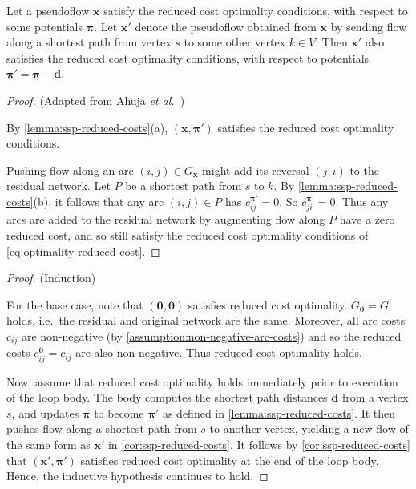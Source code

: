 \begin{cor} \label{cor:ssp-reduced-costs}
    Let a pseudoflow $\mathbf{x}$ satisfy the reduced cost optimality conditions, with respect to some potentials $\boldsymbol{\pi}$. Let $\mathbf{x}'$ denote the pseudoflow obtained from $\mathbf{x}$ by sending flow along a shortest path from vertex $s$ to some other vertex $k \in V$. Then $\mathbf{x}'$ also satisfies the reduced cost optimality conditions, with respect to potentials $\boldsymbol{\pi}' = \boldsymbol{\pi} - \mathbf{d}$.
\end{cor}
\begin{proof} (Adapted from Ahuja \textit{et al.}~\cite[lemma~9.12]{Ahuja:1993})
    
    By \cref{lemma:ssp-reduced-costs}(a), $\left(\mathbf{x},\boldsymbol{\pi'}\right)$ satisfies the reduced cost optimality conditions.
    
    Pushing flow along an arc $(i,j) \in G_{\mathbf{x}}$ might add its reversal $(j,i)$ to the residual network. Let $P$ be a shortest path from $s$ to $k$. By \cref{lemma:ssp-reduced-costs}(b), it follows that any arc $(i,j) \in P$ has $c^{\boldsymbol{\pi}'}_{ij} = 0$. So $c^{\boldsymbol{\pi}'}_{ji} = 0$. Thus any arcs are added to the residual network by augmenting flow along $P$ have a zero reduced cost, and so still satisfy the reduced cost optimality conditions of \cref{eq:optimality-reduced-cost}.
\end{proof}

\sspinvariant*
\begin{proof} (Induction)
    
    For the base case, note that $(\mathbf{0},\mathbf{0})$ satisfies reduced cost optimality. $G_{\boldsymbol{0}} = G$ holds, i.e.\ the residual and original network are the same. Moreover, all arc costs $c_{ij}$ are non-negative (by \cref{assumption:non-negative-arc-costs}) and so the reduced costs $c^{\boldsymbol{0}}_{ij}=c_{ij}$ are also non-negative. Thus reduced cost optimality holds.
    
    Now, assume that reduced cost optimality holds immediately prior to execution of the loop body. The body computes the shortest path distances $\mathbf{d}$ from a vertex $s$, and updates $\boldsymbol{\pi}$ to become $\boldsymbol{\pi'}$ as defined in \cref{lemma:ssp-reduced-costs}. It then pushes flow along a shortest path from $s$ to another vertex, yielding a new flow of the same form as $\mathbf{x'}$ in \cref{cor:ssp-reduced-costs}. It follows by \cref{cor:ssp-reduced-costs} that $(\mathbf{x}',\boldsymbol{\pi}')$ satisfies reduced cost optimality at the end of the loop body. Hence, the inductive hypothesis continues to hold.
\end{proof}

